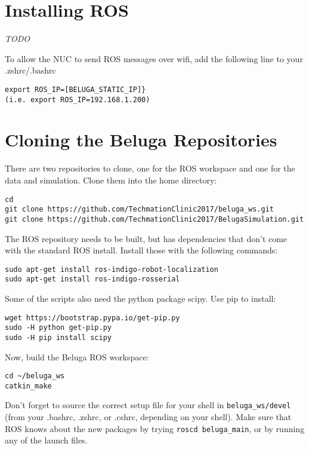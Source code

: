 \documentclass{article}
\newcommand{\todo}{ \begin{center} \large \emph{TODO} \end{center}}
\begin{document}
\section*{Installing ROS}
\todo
To allow the NUC to send ROS messages over wifi, add the following line to your .zshrc/.bashrc \begin{verbatim}
export ROS_IP=[BELUGA_STATIC_IP]} 
(i.e. export ROS_IP=192.168.1.200)
\end{verbatim}

\section*{Cloning the Beluga Repositories}
There are two repositories to clone, one for the ROS workspace and one for the data and simulation.
Clone them into the home directory:

\begin{verbatim}
cd
git clone https://github.com/TechmationClinic2017/beluga_ws.git
git clone https://github.com/TechmationClinic2017/BelugaSimulation.git
\end{verbatim}

The ROS repository needs to be built, but has dependencies that don't come with the standard ROS install.
Install those with the following commands:

\begin{verbatim}
sudo apt-get install ros-indigo-robot-localization
sudo apt-get install ros-indigo-rosserial
\end{verbatim}

Some of the scripts also need the python package scipy.
Use pip to install:
\begin{verbatim}
wget https://bootstrap.pypa.io/get-pip.py
sudo -H python get-pip.py
sudo -H pip install scipy
\end{verbatim}

Now, build the Beluga ROS workspace:

\begin{verbatim}
cd ~/beluga_ws
catkin_make
\end{verbatim}

Don't forget to source the correct setup file for your shell in \texttt{beluga\_ws/devel} (from your .bashrc, .zshrc, or .cshrc, depending on your shell).
Make sure that ROS knows about the new packages by trying \texttt{roscd beluga\_main}, or by running any of the launch files.
\end{document}
